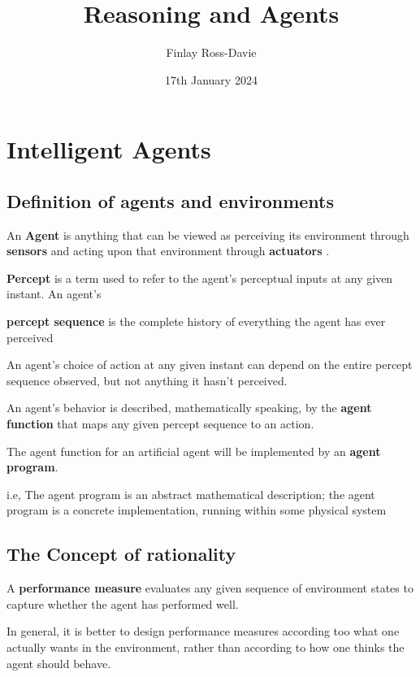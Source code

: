 \documentclass{article}
\title{Reasoning and Agents}
\author{Finlay Ross-Davie}
\date{17th January 2024}
\begin{document}
\maketitle


\section{Intelligent Agents}

\subsection{Definition of agents and environments}

An \textbf{Agent} is anything that can be viewed as perceiving its environment through \textbf{sensors} and acting upon that environment through \textbf{actuators} \newline. 

\textbf{Percept} is a term used to refer to the agent's perceptual inputs at any given instant. An agent's 

\textbf{percept sequence} is the complete history of everything the agent has ever perceived \newline

An agent's choice of action at any given instant can depend on the entire percept sequence observed, but not anything it hasn't perceived.

An agent's behavior is described, mathematically speaking, by the \textbf{agent function} that maps any given percept sequence to an action.

The agent function for an artificial agent will be implemented by an \textbf{agent program}.

i.e, The agent program is an abstract mathematical description; the agent program is a concrete implementation, running within some physical system 

\subsection{The Concept of rationality}

A \textbf{performance measure} evaluates any given sequence of environment states to capture whether the agent has performed well.

In general, it is better to design performance measures according too what one actually wants in the environment, rather than according to how one thinks the agent should behave. \newline
\end{document}
